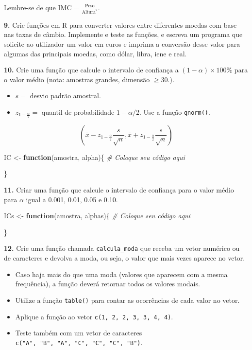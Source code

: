 \documentclass[
]{book}
\newenvironment{Shaded}{\begin{snugshade}}{\end{snugshade}}
\newcommand{\CommentTok}[1]{\textcolor[rgb]{0.56,0.35,0.01}{\textit{#1}}}
\newcommand{\ControlFlowTok}[1]{\textcolor[rgb]{0.13,0.29,0.53}{\textbf{#1}}}
\newcommand{\NormalTok}[1]{#1}
\newcommand{\OtherTok}[1]{\textcolor[rgb]{0.56,0.35,0.01}{#1}}
\begin{document}
Lembre-se de que IMC = \(\frac{\text{Peso}}{\text{Altura}^2}\).

\textbf{9.} Crie funções em R para converter valores entre diferentes moedas
com base nas taxas de câmbio. Implemente e teste as funções, e escreva
um programa que solicite ao utilizador um valor em euros e imprima a
conversão desse valor para algumas das principais moedas, como dólar,
libra, iene e real.

\textbf{10.} Crie uma função que calcule o intervalo de confiança a \((1-\alpha)\times 100\%\) para o
valor médio (nota: amostras grandes, dimensão \(\geq 30\).).

\begin{itemize}
\item
  \(s =\) desvio padrão amostral.
\item
  \(z_{1-\frac{\alpha}{2}} =\) quantil de probabilidade \(1-\alpha/2\). Use a função \texttt{qnorm()}.
\end{itemize}

\[\left(\bar{x}-z_{1-\frac{\alpha}{2}}\frac{s}{\sqrt{n}},\bar{x}+z_{1-\frac{\alpha}{2}}\frac{s}{\sqrt{n}}  \right)\]

\begin{Shaded}
\begin{Highlighting}[]
\NormalTok{IC }\OtherTok{\textless{}{-}} \ControlFlowTok{function}\NormalTok{(amostra, alpha)\{}
  \CommentTok{\# Coloque seu código aqui}
  
\NormalTok{\}}
\end{Highlighting}
\end{Shaded}

\textbf{11.} Criar uma função que calcule o intervalo de confiança para o valor médio para \(\alpha\) igual a 0.001, 0.01, 0.05 e 0.10.

\begin{Shaded}
\begin{Highlighting}[]
\NormalTok{ICs }\OtherTok{\textless{}{-}} \ControlFlowTok{function}\NormalTok{(amostra, alphas)\{}
  \CommentTok{\# Coloque seu código aqui}
  
\NormalTok{\}}
\end{Highlighting}
\end{Shaded}

\textbf{12.} Crie uma função chamada \texttt{calcula\_moda} que receba um vetor numérico ou de caracteres e devolva a moda, ou seja, o valor que mais vezes aparece no vetor.

\begin{itemize}
\item
  Caso haja mais do que uma moda (valores que aparecem com a mesma frequência), a função deverá retornar todos os valores modais.
\item
  Utilize a função \texttt{table()} para contar as ocorrências de cada valor no vetor.
\item
  Aplique a função ao vetor \texttt{c(1,\ 2,\ 2,\ 3,\ 3,\ 4,\ 4)}.
\item
  Teste também com um vetor de caracteres \texttt{c("A",\ "B",\ "A",\ "C",\ "C",\ "C",\ "B")}.
\end{itemize}
\end{document}
